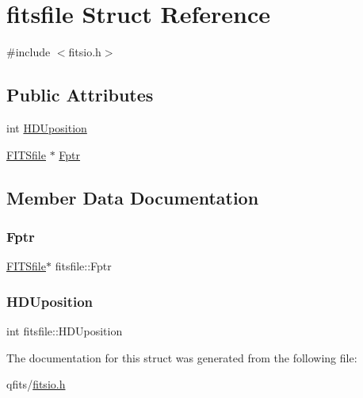 \hypertarget{structfitsfile}{}\section{fitsfile Struct Reference}
\label{structfitsfile}


{\ttfamily \#include $<$fitsio.\+h$>$}

\subsection*{Public Attributes}
\begin{DoxyCompactItemize}
\item 
int \hyperlink{structfitsfile_a0b1d48e862cf8fb644e293e5899a7b68}{H\+D\+Uposition}
\item 
\hyperlink{struct_f_i_t_sfile}{F\+I\+T\+Sfile} $\ast$ \hyperlink{structfitsfile_a4ce1e99e95954c8c42ccd93401c9f477}{Fptr}
\end{DoxyCompactItemize}


\subsection{Member Data Documentation}
\mbox{\label{structfitsfile_a4ce1e99e95954c8c42ccd93401c9f477}} 
\subsubsection{\texorpdfstring{Fptr}{Fptr}}
{\footnotesize\ttfamily \hyperlink{struct_f_i_t_sfile}{F\+I\+T\+Sfile}$\ast$ fitsfile\+::\+Fptr}

\mbox{\label{structfitsfile_a0b1d48e862cf8fb644e293e5899a7b68}} 
\subsubsection{\texorpdfstring{H\+D\+Uposition}{HDUposition}}
{\footnotesize\ttfamily int fitsfile\+::\+H\+D\+Uposition}



The documentation for this struct was generated from the following file\+:\begin{DoxyCompactItemize}
\item 
qfits/\hyperlink{fitsio_8h}{fitsio.\+h}\end{DoxyCompactItemize}
